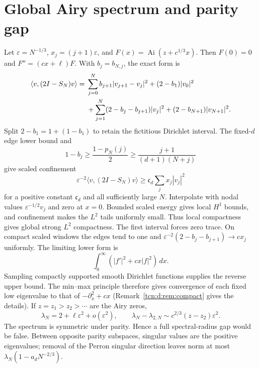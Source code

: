 \documentclass[11pt,letterpaper]{article}
\newcommand{\Ai}{\operatorname{Ai}}
\newcommand{\ip}[2]{\langle#1,#2\rangle}
\newcommand{\eps}{\varepsilon}
\theoremstyle{remark}
\begin{document}
\section{Global Airy spectrum and parity gap}\label{tcn:d:sec:spectrum}
Let $\eps=N^{-1/3}$, $x_j=(j+1)\eps$, and
$F(x)=\Ai(z+c^{1/3}x)$. Then $F(0)=0$ and $F''=(cx+\ell)F$. With $b_j=b_{N,j}$, the exact form is
\begin{align}\label{tcn:d:form}
 \ip v{(2I-S_N)v}={}&\sum_{j=0}^N b_{j+1}|v_{j+1}-v_j|^2
 +(2-b_1)|v_0|^2\notag\\
 &+\sum_{j=1}^N(2-b_j-b_{j+1})|v_j|^2
 +(2-b_{N+1})|v_{N+1}|^2.
\end{align}
Split $2-b_1=1+(1-b_1)$ to retain the fictitious Dirichlet interval. The fixed-$d$ edge lower bound and
\[
 1-b_j\ge\frac{1-p_N(j)}2\ge\frac{j+1}{(d+1)(N+j)}
\]
give scaled confinement
\[
 \eps^{-2}\ip v{(2I-S_N)v}\ge \mathfrak c_d\sum_jx_j|v_j|^2
\]
for a positive constant $\mathfrak c_d$ and all sufficiently large $N$.
Interpolate with nodal values $\eps^{-1/2}v_j$ and zero at $x=0$. Bounded scaled energy gives local $H^1$ bounds, and confinement makes the $L^2$ tails uniformly small. Thus local compactness gives global strong $L^2$ compactness. The first interval forces zero trace. On compact scaled windows the edges tend to one and
$\eps^{-2}(2-b_j-b_{j+1})\to cx_j$ uniformly. The limiting lower form is
\[
 \int_0^\infty(|f'|^2+cx|f|^2)\,dx.
\]
Sampling compactly supported smooth Dirichlet functions supplies the reverse upper bound. The min--max principle therefore gives convergence of each fixed low eigenvalue to that of $-\partial_x^2+cx$ (Remark~\ref{tcn:d:rem:compact} gives the details). If $z=z_1>z_2>\cdots$ are the Airy zeros,
\begin{equation}\label{tcn:d:gap}
 \lambda_N=2+\ell\eps^2+o(\eps^2),\qquad
 \lambda_N-\lambda_{2,N}\sim c^{2/3}(z-z_2)\eps^2.
\end{equation}
The spectrum is symmetric under parity. Hence a full spectral-radius gap would be false. Between opposite parity subspaces, singular values are the positive eigenvalues; removal of the Perron singular direction leaves norm at most $\lambda_N(1-a_dN^{-2/3})$.
\end{document}
